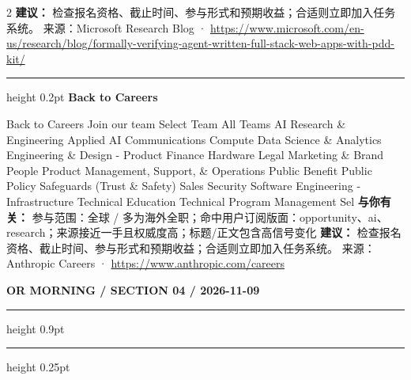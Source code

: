 \documentclass[10.5pt]{ctexart}
\begin{document}
\begin{multicols}{2}
\textbf{建议：} 检查报名资格、截止时间、参与形式和预期收益；合适则立即加入任务系统。
{\footnotesize\color{ormuted} 来源：Microsoft Research Blog · \url{https://www.microsoft.com/en-us/research/blog/formally-verifying-agent-written-full-stack-web-apps-with-pdd-kit/}}
\vspace{2mm}
\hrule height 0.2pt
\vspace{2mm}
{\large\bfseries Back to Careers}\par
Back to Careers Join our team Select Team All Teams AI Research \& Engineering Applied AI Communications Compute Data Science \& Analytics Engineering \& Design - Product Finance Hardware Legal Marketing \& Brand People Product Management, Support, \& Operations Public Benefit Public Policy Safeguards (Trust \& Safety) Sales Security Software Engineering - Infrastructure Technical Education Technical Program Management Sel
\textbf{与你有关：} 参与范围：全球 / 多为海外全职；命中用户订阅版面：opportunity、ai、research；来源接近一手且权威度高；标题/正文包含高信号变化
\textbf{建议：} 检查报名资格、截止时间、参与形式和预期收益；合适则立即加入任务系统。
{\footnotesize\color{ormuted} 来源：Anthropic Careers · \url{https://www.anthropic.com/careers}}
\end{multicols}
\newpage
{\small\bfseries OR MORNING / SECTION 04 / 2026-11-09}
\vspace{2mm}
\hrule height 0.9pt
\vspace{1.5mm}
\hrule height 0.25pt
\vspace{4mm}
\end{document}

